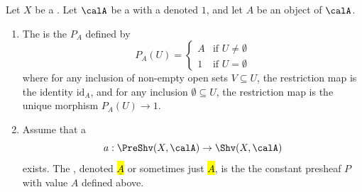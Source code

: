 \begin{definition} \label{definition:constant_sheaf_on_a_topological_space_valued_in_category_admitting_sheafification}
    Let $X$ be a . Let $\calA$ be a  with a  denoted $1$, and let $A$ be an object of $\calA$.

    \begin{enumerate}
        \item The  is the  $P_A$ defined by
        \[
        P_A(U) = \begin{cases} 
        A & \text{if } U \neq \emptyset \\
        1 & \text{if } U = \emptyset
        \end{cases}
        \]
        where for any inclusion of non-empty open sets $V \subseteq U$, the restriction map is the identity $\text{id}_A$, and for any inclusion $\emptyset \subseteq U$, the restriction map is the unique morphism $P_A(U) \to 1$.

        \item Assume that a  
        $$a: \PreShv(X, \calA) \to \Shv(X, \calA)$$
        exists. The , denoted \hl{$\underline{A}$} or sometimes just \hl{$A$}, is the  the constant presheaf $P$ with value $A$ defined above.


    \end{enumerate}
\end{definition}